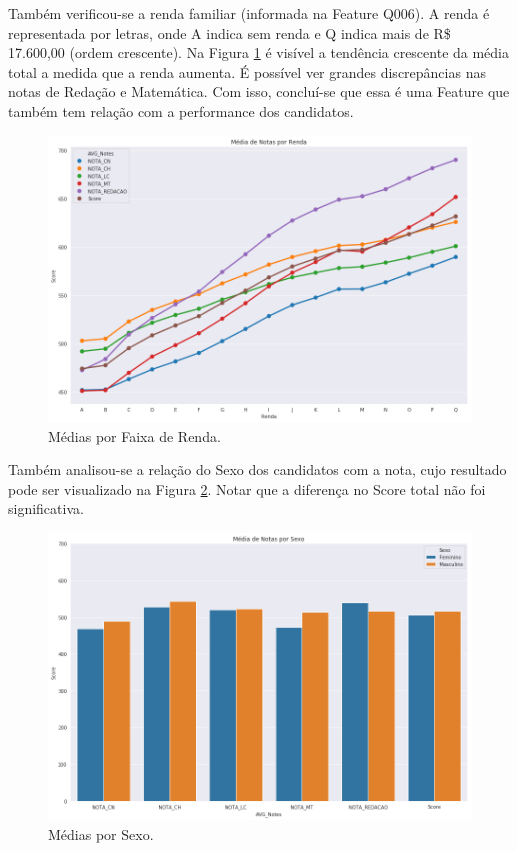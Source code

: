 \documentclass{article}
\begin{document}
Também verificou-se a renda familiar (informada na Feature Q006). A renda é representada por letras, onde A indica sem renda e Q indica mais de R\$ 17.600,00 (ordem crescente). Na Figura \ref{fig:mean_by_wage} é visível a tendência crescente da média total a medida que a renda aumenta. É possível ver grandes discrepâncias nas notas de Redação e Matemática. Com isso, concluí-se que essa é uma Feature que também tem relação com a performance dos candidatos.

\begin{figure}[H]
\centering
  \includegraphics[width=0.8 \linewidth]{img/mean_by_wage.png}
  \caption{Médias por Faixa de Renda.}
  \label{fig:mean_by_wage}
\end{figure}

Também analisou-se a relação do Sexo dos candidatos com a nota, cujo resultado pode ser visualizado na Figura \ref{fig:mean_by_sex}. Notar que a diferença no Score total não foi significativa.

\begin{figure}[H]
\centering
  \includegraphics[width=0.8 \linewidth]{img/mean_by_sex.png}
  \caption{Médias por Sexo.}
  \label{fig:mean_by_sex}
\end{figure}
\end{document}
